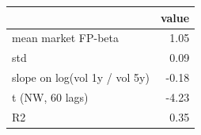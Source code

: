 \begin{tabular}{lr}
\toprule
 & value \\
\midrule
mean market FP-beta & 1.05 \\
std & 0.09 \\
slope on log(vol 1y / vol 5y) & -0.18 \\
t (NW, 60 lags) & -4.23 \\
R2 & 0.35 \\
\bottomrule
\end{tabular}
